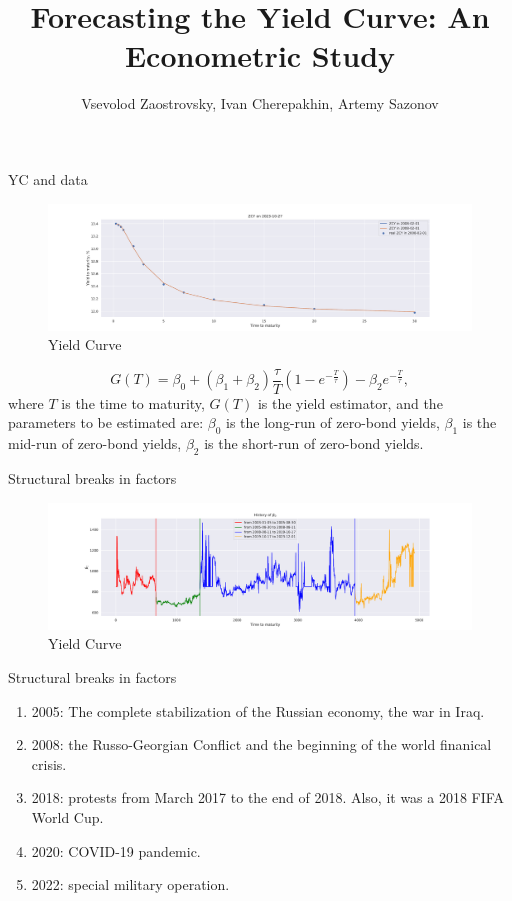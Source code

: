 \documentclass[aspectratio=169]{beamer}
\title{Forecasting the Yield Curve: An Econometric Study}
\subtitle{}
\author{Vsevolod Zaostrovsky, Ivan Cherepakhin, Artemy Sazonov}
\institute{Lomonosov Moscow State University}
\begin{document}
\maketitle

\begin{frame}{YC and data}
    \begin{figure}
        \includegraphics[scale=0.21]{fig/ZCYp.pdf}
        \caption{Yield Curve }
        \label{fig:YTMp}
    \end{figure}
    \begin{equation}\label{eq:NS}
        G(T) = \beta_0 + (\beta_1+\beta_2)\frac{\tau}{T}\left(1-e^{-\frac{T}{\tau}}\right)-\beta_2  e^{-\frac{T}{\tau}},
    \end{equation}
    where $T$ is the time to maturity, $G(T)$ is the yield estimator, 
    and the parameters to be estimated are: $\beta_0$ is the long-run of zero-bond yields, $\beta_1$ is the mid-run of zero-bond yields, 
    $\beta_2$ is the short-run of zero-bond yields.
    
\end{frame}

\begin{frame}{Structural breaks in factors}

    \begin{figure}
        \includegraphics[scale=0.31]{fig/StrBreaks.pdf}
        \caption{Yield Curve }
        \label{fig:StrBreaks}
    \end{figure}
\end{frame}

\begin{frame}{Structural breaks in factors}
    \begin{enumerate}
        \item 2005: The complete stabilization of the Russian economy, the war in Iraq. 
        \item 2008: the Russo-Georgian Conflict and the beginning of the world finanical crisis.
        \item 2018: protests from March 2017 to the end of 2018. Also, it was a 2018 FIFA World Cup.
        \item 2020: COVID-19 pandemic.
        \item 2022: special military operation.
    \end{enumerate}

\end{frame}
\end{document}
